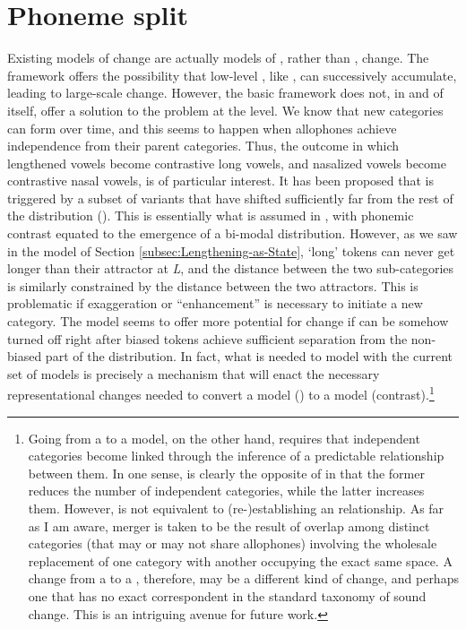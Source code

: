 \section{\label{subsec:Phoneme-Split}Phoneme split}

Existing  models of change are actually models of ,
rather than , change. The framework offers the possibility
that low-level , like  , can
successively accumulate, leading to large-scale change. However, the
basic framework does not, in and of itself, offer a solution to the
 problem at the  level. We know that new 
categories can form over time, and this seems to happen when 
allophones achieve independence from their parent categories. Thus,
the outcome in which lengthened vowels become contrastive long vowels,
and nasalized vowels become contrastive nasal vowels, is of particular
interest. It has been proposed that  is triggered by
a subset of  variants that have shifted sufficiently far from
the rest of the distribution (\citealt{Janda2003,Janda2008}). This
is essentially what is assumed in \citet{Wedel2008}, with phonemic
contrast equated to the emergence of a bi-modal distribution. However,
as we saw in the  model of Section \ref{subsec:Lengthening-as-State},
`long' tokens can never get longer than their attractor at \emph{L},
and the distance between the two sub-categories is similarly constrained
by the distance between the two attractors. This is problematic if
 exaggeration or “enhancement” is necessary to initiate
a new  category. The  model seems to offer
more potential for  change if  can be somehow
turned off right after biased tokens achieve sufficient separation
from the non-biased part of the distribution. In fact, what is needed
to model  with the current set of models is precisely
a mechanism that will enact the necessary representational changes
needed to convert a  model () to a 
model (contrast).\footnote{Going from a  to a  model, on the other
hand, requires that independent categories become linked through the
inference of a predictable relationship between them. In one sense,
 is clearly the opposite of  in that the
former reduces the number of independent categories, while the latter
increases them. However,  is not equivalent to (re-)establishing
an  relationship. As far as I am aware, merger is taken
to be the result of  overlap among distinct categories (that
may or may not share allophones) involving the wholesale replacement
of one category with another occupying the exact same  space.
A change from a  to a , therefore, may be
a different kind of change, and perhaps one that has no exact correspondent
in the standard taxonomy of sound change. This is an intriguing avenue
for future work.}


